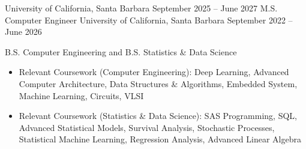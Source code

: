 \documentclass[9pt]{developercv} %
\begin{document}
\vspace{-8 pt}
\begin{entrylist}

\vspace{-4pt}

    \entry
    {}
    {University of California, Santa Barbara}
    {September 2025 – June 2027}
    {M.S. Computer Engineer}
    \entry
    {}
    {University of California, Santa Barbara}
    {September 2022 – June 2026}
    {B.S. Computer Engineering and B.S. Statistics \& Data Science 
    \begin{itemize}[noitemsep,topsep=0pt,parsep=0pt,partopsep=0pt, leftmargin=10pt]
        \item Relevant Coursework (Computer Engineering): Deep Learning, Advanced Computer Architecture, Data Structures \& Algorithms, Embedded System, Machine Learning, Circuits, VLSI
        \item Relevant Coursework (Statistics \& Data Science): SAS Programming, SQL, Advanced Statistical Models, Survival Analysis, Stochastic Processes, Statistical Machine Learning, Regression Analysis, Advanced Linear Algebra
    \end{itemize}}
    
    
    
\end{entrylist}
\end{document}

